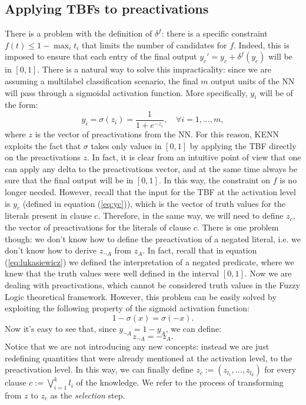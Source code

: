 
\subsection{Applying TBFs to preactivations} 
\label{sec:tbf_preac}
There is a problem with the definition of $\delta^f$: there is a specific constraint $f(t) \leq 1 - \max_i t_i$ that limits the number of candidates for $f$. Indeed, this is imposed to ensure that each entry of the final output $y_c'= y_c + \delta^f(y_c)$ will be in $\left[0,1\right]$. There is a natural way to solve this impracticality: since we are assuming a multilabel classification scenario, the final $m$ output units of the NN will pass through a sigmoidal activation function. More specifically, $y_i$ will be of the form:
\begin{equation*}
y_i = \sigma(z_i) = \frac{1}{1+e^{-z_i}}, \quad \forall i=1,\dots,m,
\end{equation*}
where $z$ is the vector of preactivations from the NN. For this reason, KENN exploits the fact that $\sigma$ takes only values in $\left[0,1\right]$ by applying the TBF directly on the preactivations $z$. In fact, it is clear from an intuitive point of view that one can apply any delta to the preactivations vector, and at the same time always be sure that the final output will be in $\left[0,1\right]$. In this way, the constraint on $f$ is no longer needed. 
However, recall that the input for the TBF at the activation level is $y_c$ (defined in equation (\ref{eq:yc})), which is the vector of truth values for the literals present in clause $c$. Therefore, in the same way, we will need to define $z_c$, the vector of preactivations for the literals of clause $c$. There is one problem though: we don't know how to define the preactivation of a negated literal, i.e. we don't know how to derive $z_{\neg A}$ from $z_A$. In fact, recall that in equation (\ref{eq:lukasiewicz}) we defined the interpretation of a negated predicate, where we knew that the truth values were well defined in the interval $\left[0,1\right]$. Now we are dealing with preactivations, which cannot be considered truth values in the Fuzzy Logic theoretical framework. However, this problem can be easily solved by exploiting the following property of the sigmoid activation function:
	\begin{equation*}
	1 - \sigma(x) = \sigma(-x).
	\end{equation*}
	Now it's easy to see that, since $y_{\neg A} = 1 - y_A$, we can define:
	\begin{equation*}
	z_{\neg A} = -z_A.
	\end{equation*}
	Notice that we are not introducing any new concepts: instead we are just redefining quantities that were already mentioned at the activation level, to the preactivation level.
	In this way, we can finally define $z_c := \left(z_{l_1}, \dots, z_{l_k}\right)$ for every clause $c := \bigvee_{i=1}^k l_i$ of the knowledge. We refer to the process of transforming from $z$ to $z_c$ as the \textit{selection} step.

